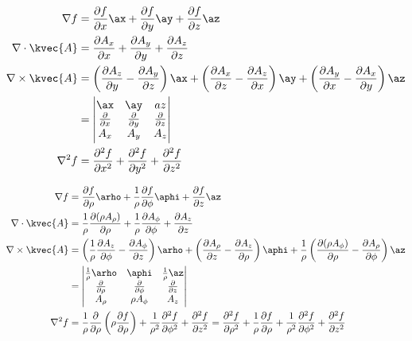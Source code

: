
\begin{align*}
\nabla f&=\frac{\partial f}{\partial x}\ax+\frac{\partial f}{\partial y}\ay+\frac{\partial f}{\partial z}\az\\
\nabla \cdot \kvec{A}&=\frac{\partial A_x}{\partial x}+\frac{\partial A_y}{\partial y}+\frac{\partial A_z}{\partial z}\\
\nabla \times \kvec{A}&=\left(\frac{\partial A_z}{\partial y}-\frac{\partial A_y}{\partial z} \right)\ax+\left(\frac{\partial A_x}{\partial z}-\frac{\partial A_z}{\partial x} \right)\ay+\left(\frac{\partial A_y}{\partial x}-\frac{\partial A_x}{\partial y} \right)\az\\
&=\begin{vmatrix}  \ax & \ay & az\\ \frac{\partial}{\partial x}& \frac{\partial }{\partial y} & \frac{\partial }{\partial z}\\ A_x & A_y & A_z \end{vmatrix}\\
\nabla^2 f &=\frac{\partial^2 f}{\partial x^2}+\frac{\partial^2 f}{\partial y^2}+\frac{\partial^2 f}{\partial z^2}
\end{align*}


\begin{align*}
\nabla f &=\frac{\partial f}{\partial \rho}\arho+\frac{1}{\rho}\frac{\partial f}{\partial \phi}\aphi+\frac{\partial f}{\partial z}\az\\
\nabla \cdot \kvec{A}&=\frac{1}{\rho}\frac{\partial (\rho A_{\rho})}{\partial \rho}+\frac{1}{\rho}\frac{\partial A_{\phi}}{\partial \phi}+\frac{\partial A_z}{\partial z}\\
\nabla \times \kvec{A}&=\left(\frac{1}{\rho}\frac{\partial A_z}{\partial \phi}-\frac{\partial A_{\phi}}{\partial z} \right)\arho+\left(\frac{\partial A_{\rho}}{\partial z}-\frac{\partial A_z}{\partial \rho} \right)\aphi+\frac{1}{\rho}\left(\frac{\partial (\rho A_{\phi})}{\partial \rho}-\frac{\partial A_{\rho}}{\partial \phi} \right)\az \\
&=\begin{vmatrix}\frac{1}{\rho}\arho & \aphi & \frac{1}{\rho} \az \\ \frac{\partial}{\partial\rho} & \frac{\partial}{\partial \phi} & \frac{\partial}{\partial z}\\ A_{\rho} & \rho A_{\phi} & A_z \end{vmatrix}\\
\nabla^2 f &=\frac{1}{\rho}\frac{\partial}{\partial \rho}\left(\rho \frac{\partial f}{\partial \rho} \right)+\frac{1}{\rho^2}\frac{\partial^2 f}{\partial \phi^2}+\frac{\partial^2  f}{\partial z^2}=\frac{\partial^2 f}{\partial \rho^2}+\frac{1}{\rho}\frac{\partial f}{\partial \rho}+\frac{1}{\rho^2}\frac{\partial^2 f}{\partial \phi^2}+\frac{\partial^2 f}{\partial z^2}
\end{align*}


